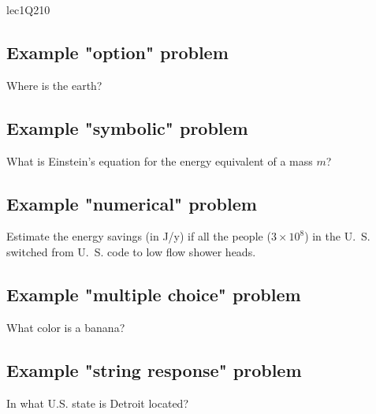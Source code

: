 \begin{edXproblem}{lec1Q2}{10}

\subsection{Example "option" problem}

Where is the earth?


\subsection{Example "symbolic" problem}

What is Einstein's equation for the energy equivalent of a mass $m$?


\subsection{Example "numerical" problem}

Estimate the energy savings (in J/y) if all the people
($3\times 10^8$) in the U.~S. switched from U.~S. code to low flow
shower heads.


\subsection{Example "multiple choice" problem}

What color is a banana?


\subsection{Example "string response" problem}

In what U.S. state is Detroit located?



\end{edXproblem}
